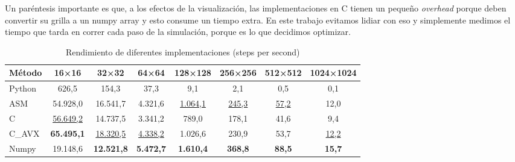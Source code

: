 \documentclass[a4paper]{article}
\begin{document}
Un paréntesis importante es que, a los efectos de la visualización, las implementaciones en C tienen un pequeño \textit{overhead} porque deben convertir su grilla a un numpy array y esto consume un tiempo extra. En este trabajo evitamos lidiar con eso y simplemente medimos el tiempo que tarda en correr cada paso de la simulación, porque es lo que decidimos optimizar. \\

\begin{table}[h]
    \centering
    \caption{Rendimiento de diferentes implementaciones (steps per second)}
    \label{tab:performance_results}
    \begin{tabular}{lccccccc}
        \toprule
        \textbf{Método} & \textbf{16×16}       & \textbf{32×32}       & \textbf{64×64}      & \textbf{128×128}    & \textbf{256×256}  & \textbf{512×512} & \textbf{1024×1024} \\
        \midrule
        Python          & 626,5                & 154,3                & 37,3                & 9,1                 & 2,1               & 0,5              & 0,1                \\
        ASM             & 54.928,0             & 16.541,7             & 4.321,6             & \underline{1.064,1} & \underline{245,3} & \underline{57,2} & 12,0               \\
        C               & \underline{56.649,2} & 14.737,5             & 3.341,2             & 789,0               & 178,1             & 41,6             & 9,4                \\
        C\_AVX          & \textbf{65.495,1}    & \underline{18.320,5} & \underline{4.338,2} & 1.026,6             & 230,9             & 53,7             & \underline{12,2}   \\
        Numpy           & 19.148,6             & \textbf{12.521,8}    & \textbf{5.472,7}    & \textbf{1.610,4}    & \textbf{368,8 }   & \textbf{88,5}    & \textbf{15,7}      \\
        \bottomrule
    \end{tabular}
\end{table}
\end{document}
